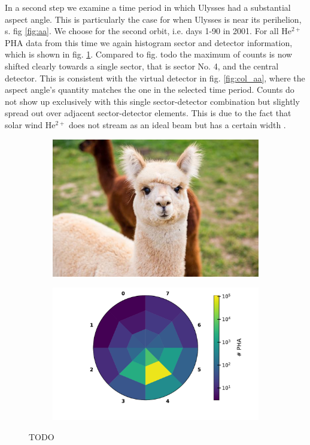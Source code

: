 In a second step we examine a time period in which Ulysses had a substantial aspect angle. This is particularly the case for when Ulysses is near its perihelion, s. fig \ref{fig:aa}. We choose for the second orbit, i.e. days 1-90 in 2001. For all $\mathrm{He^{2+}}$ PHA data from this time we again histogram sector and detector information, which is shown in fig. \ref{fig:histdetsecaa}. Compared to fig. todo the maximum of counts is now shifted clearly towards a single sector, that is sector No. 4, and the central detector. This is consistent with the virtual detector in fig. \ref{fig:col_aa}, where the aspect angle's quantity matches the one in the selected time period. Counts do not show up exclusively with this single sector-detector combination but slightly spread out over adjacent sector-detector elements. This is due to the fact that solar wind $\mathrm{He^{2+}}$ does not stream as an ideal beam but has a certain width \citep[][,ch. 6.1]{prlss_2004}.


\begin{figure}
	\centering
	\begin{subfigure}{.5\textwidth}
		\centering
		\includegraphics[width=1\textwidth]{Figures/dummy.jpg}
	\end{subfigure}%
	\begin{subfigure}{.5\textwidth}
		\centering
		\includegraphics[width=1\textwidth]{Figures/hist_det_sec_aa_90days2001.pdf}
	\end{subfigure}
	\caption{TODO}
\label{fig:histdetsecaa}
\end{figure}




